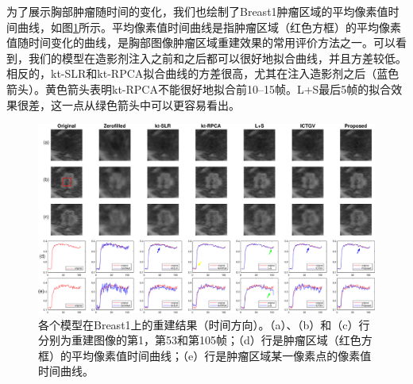为了展示胸部肿瘤随时间的变化，我们也绘制了Breast1肿瘤区域的平均像素值时间曲线，如图\ref{fig:breast1_time}所示。平均像素值时间曲线是指肿瘤区域（红色方框）的平均像素值随时间变化的曲线，是胸部图像肿瘤区域重建效果的常用评价方法之一。可以看到，我们的模型在造影剂注入之前和之后都可以很好地拟合曲线，并且方差较低。相反的，kt-SLR和kt-RPCA拟合曲线的方差很高，尤其在注入造影剂之后（蓝色箭头）。黄色箭头表明kt-RPCA不能很好地拟合前10--15帧。L+S最后5帧的拟合效果很差，这一点从绿色箭头中可以更容易看出。
\begin{figure}
\centering
\includegraphics[width=1\textwidth]{img/tgvnn/figure6_breast1_frames.eps}
\caption{各个模型在Breast1上的重建结果（时间方向）。（a）、（b）和（c）行分别为重建图像的第1，第53和第105帧；（d）行是肿瘤区域（红色方框）的平均像素值时间曲线；（e）行是肿瘤区域某一像素点的像素值时间曲线。}
\label{fig:breast1_time}
\end{figure} 

